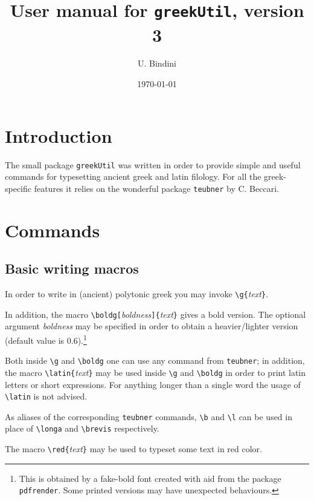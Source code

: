 \documentclass[11pt,a4paper]{article}
\title{User manual for \texttt{greekUtil}, version 3}
\author{U. Bindini}
\date{\today}
\begin{document}
	\maketitle
	
	\section{Introduction}
	
	The small package \texttt{greekUtil} was written in order to provide simple and useful commands for typesetting ancient greek and latin filology. For all the greek-specific features it relies on the wonderful package \verb|teubner| by C. Beccari.
	
	\section{Commands}
	
	\subsection{Basic writing macros}
	
	In order to write in (ancient) polytonic greek you may invoke \verb|\g{|\emph{text}\verb|}|.
	
	In addition, the macro \verb|\boldg[|\emph{boldness}\verb|]{|\emph{text}\verb|}| gives a bold version. The optional argument \emph{boldness} may be specified in order to obtain a heavier/lighter version (default value is 0.6).\footnote{This is obtained by a fake-bold font created with aid from the package \texttt{pdfrender}. Some printed versions may have unexpected behaviours.}
	
	Both inside \verb|\g| and \verb|\boldg| one can use any command from \verb|teubner|; in addition, the macro \verb|\latin{|\emph{text}\verb|}| may be used inside \verb|\g| and \verb|\boldg| in order to print latin letters or short expressions. For anything longer than a single word the usage of \verb|\latin| is not advised.
	
	As aliases of the corresponding \verb|teubner| commands, \verb|\b| and \verb|\l| can be used in place of \verb|\longa| and \verb|\brevis| respectively.
	
	The macro \verb|\red{|\emph{text}\verb|}| may be used to typeset some text in red color.
	
\end{document}
